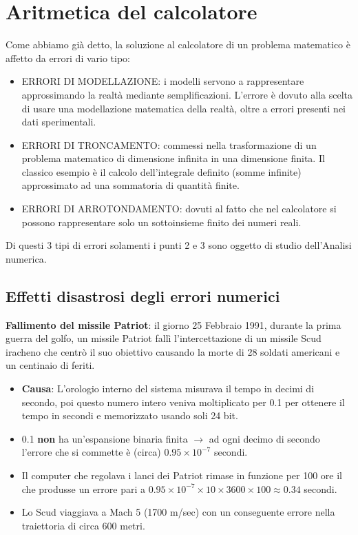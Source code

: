 \documentclass[a4paper, 11pt]{article}
\begin{document}
        \pagebreak 
    \section{Aritmetica del calcolatore}
        
    Come abbiamo già detto, la soluzione al calcolatore di un problema matematico è affetto da errori di vario tipo:

        \begin{itemize}
            \item ERRORI DI MODELLAZIONE: i modelli servono a rappresentare approssimando la realtà mediante semplificazioni. L'errore è dovuto alla scelta di usare una modellazione matematica della realtà, oltre a errori presenti nei dati sperimentali.
            \item ERRORI DI TRONCAMENTO: commessi nella trasformazione di un problema matematico di dimensione infinita in una dimensione finita. Il classico esempio è il calcolo dell'integrale definito (somme infinite) approssimato ad una sommatoria di quantità finite.
            \item ERRORI DI ARROTONDAMENTO: dovuti al fatto che nel calcolatore si possono rappresentare solo un sottoinsieme finito dei numeri reali.
        \end{itemize} 

        Di questi 3 tipi di errori solamenti i punti 2 e 3 sono oggetto di studio dell'Analisi numerica.

        \subsection*{Effetti disastrosi degli errori numerici}

            \textbf{Fallimento del missile Patriot}: il giorno 25 Febbraio 1991, durante la prima guerra del golfo, un missile Patriot fallì l’intercettazione di un missile Scud iracheno che centrò il suo obiettivo causando la morte di 28 soldati americani e un centinaio di feriti.

            \begin{itemize}
                \item \textbf{Causa}: L’orologio interno del sistema misurava il tempo in decimi di secondo, poi questo numero intero veniva moltiplicato per 0.1 per ottenere il tempo in secondi e memorizzato usando soli 24 bit.
                \item 0.1 \textbf{non} ha un’espansione binaria finita $\longrightarrow$ ad ogni decimo di secondo l’errore che si commette è (circa) $0.95 \times 10^{-7}$ secondi.
                \item Il computer che regolava i lanci dei Patriot rimase in funzione per 100 ore il che produsse un errore pari a $0.95 \times 10^{-7} \times 10 \times 3600 \times 100 \approx 0.34$ secondi.
                \item Lo Scud viaggiava a Mach 5 (1700 m/sec) con un conseguente errore nella traiettoria di circa 600 metri.
            \end{itemize}
\end{document}
